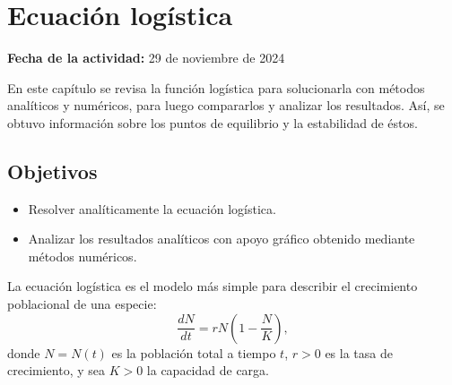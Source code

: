 \documentclass[../portafolio.tex]{subfiles}
\begin{document}
\chapter{Ecuación logística}
\label{g4_ej11}
\hfill \textbf{Fecha de la actividad:} 29 de noviembre de 2024

\medskip

En este capítulo se revisa la función logística para solucionarla con métodos analíticos y numéricos, para luego compararlos y analizar los resultados. Así, se obtuvo información sobre los puntos de equilibrio y la estabilidad de éstos.

\section*{Objetivos}
\begin{itemize}
\item Resolver analíticamente la ecuación logística.
\item Analizar los resultados analíticos con apoyo gráfico obtenido mediante métodos numéricos.
\end{itemize}
La ecuación logística es el modelo más simple para describir el crecimiento poblacional de una especie:
\begin{equation}\label{g4_ej11:logistica}
\frac{dN}{dt}=r N \left(1 -\frac{N}{K}\right),
\end{equation}
donde $N=N(t)$ es la población total a tiempo $t$, $r>0$ es la tasa de crecimiento, y sea $K>0$  la capacidad de carga.
\end{document}
